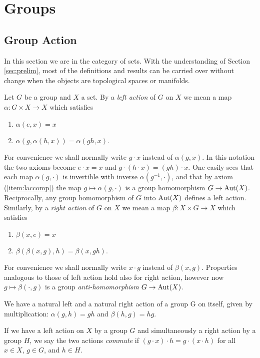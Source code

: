 \documentclass[12pt,titlepage]{article}
\def\Aut{\hbox{Aut}}
\begin{document}
\section{Groups}
\subsection{Group Action}
In this section we are in the category of sets. With the understanding
of Section \ref{sec:prelim}, most of the definitions and results can be
carried over without change when the objects are topological spaces or
manifolds.

Let \(G\) be a group and \(X\) a set.
By a {\em left action\/}
%
%
 of \(G\)
on \(X\) we mean a map \(\alpha: G\times X \to X\) which satisfies
\begin{enumerate}
\item \(\alpha(e,x) =x\)
\item \label{item:laccomp}\(\alpha(g, \alpha( h,x) ) = \alpha(gh,x)\).
\end{enumerate}%
For convenience we shall normally write \(g\cdot x\)
%
 instead of
\(\alpha(g,x)\). 
%
In this notation the two axioms become \(e\cdot x = x\)
and \(g\cdot(h\cdot x) = (gh)\cdot x\).  One easily sees that each map
 \(\alpha(g,\cdot)\) is  invertible with inverse
 \(\alpha(g^{-1},\cdot)\), and that by axiom (\ref{item:laccomp}) the map
 \(g\mapsto \alpha(g,\cdot)\) is a group homomorphism \(G \to \Aut(X)\).
Reciprocally, any group homomorphism of \(G\) into \(\Aut(X)\) defines a
left action.
Similarly, by a {\em right action\/}
%
 of \(G\)
on \(X\) we mean a map \(\beta: X\times G \to X\) which satisfies
\begin{enumerate}
\item \(\beta(x,e) =x\)
\item \(\beta( \beta(x,g),h ) = \beta(x,gh)\).
\end{enumerate}%
For convenience we shall normally write \(x\cdot g\)
% 
instead of
\(\beta(x,g)\).
%
Properties analogous to those of left action hold also for right action,
however now
\(g\mapsto \beta(\cdot,g)\) is a group {\em anti-homomorphism\/} \(G \to
\Aut(X)\).

We have a natural left and a natural right action of a group G on
itself, given by multiplication: \(\alpha(g, h) = gh\) and \(\beta(h,g)
= hg\). 

If we have a left action on \(X\) by a group \(G\) and simultaneously a
right action by a group \(H\), we say the two  actions {\em commute\/}
%
 if
\((g\cdot x)\cdot h = g \cdot (x \cdot h)\)  for all \(x\in X\), \(g\in
G\), and \(h\in H\).
\end{document}
